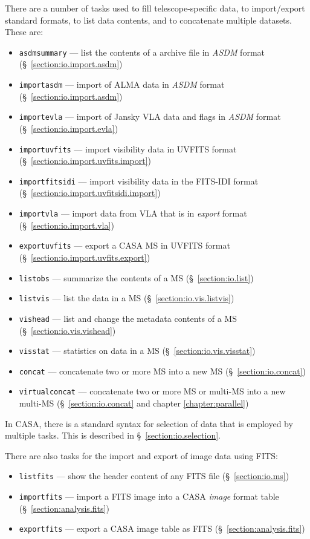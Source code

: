 There are a number of tasks used to fill telescope-specific data,
to import/export standard formats, to list data contents, and
to concatenate multiple datasets.  These are:
\begin{itemize}
   \item {\tt asdmsummary} --- list the contents of a archive file in
     {\it ASDM} format (\S~\ref{section:io.import.asdm})
   \item {\tt importasdm} --- import of ALMA data in 
         {\it ASDM} format (\S~\ref{section:io.import.asdm})
   \item {\tt importevla} --- import of Jansky VLA data and flags in 
         {\it ASDM} format (\S~\ref{section:io.import.evla})
   \item {\tt importuvfits} --- import visibility data in UVFITS
         format (\S~\ref{section:io.import.uvfits.import})
   \item {\tt importfitsidi} --- import visibility data in the
     FITS-IDI format (\S~\ref{section:io.import.uvfitsidi.import})
   \item {\tt importvla} --- import data from VLA that is in 
         {\it export} format (\S~\ref{section:io.import.vla})
   \item {\tt exportuvfits} --- export a CASA MS in UVFITS format 
         (\S~\ref{section:io.import.uvfits.export})
   \item {\tt listobs} --- summarize the contents of a MS 
         (\S~\ref{section:io.list})
   \item {\tt listvis} --- list the data in a MS 
         (\S~\ref{section:io.vis.listvis})
   \item {\tt vishead} --- list and change the metadata contents of a MS 
         (\S~\ref{section:io.vis.vishead})
   \item {\tt visstat} --- statistics on data in a MS 
         (\S~\ref{section:io.vis.visstat})
   \item {\tt concat} --- concatenate two or more MS into a
         new MS (\S~\ref{section:io.concat})
   \item {\tt virtualconcat} --- concatenate two or more MS or multi-MS into a
         new multi-MS (\S~\ref{section:io.concat} and chapter \ref{chapter:parallel})
\end{itemize}

In CASA, there is a standard syntax for selection of data that
is employed by multiple tasks.  
This is described in \S~\ref{section:io.selection}.

There are also tasks for the import and export of image data using
FITS:
\begin{itemize}
   \item {\tt listfits} --- show the header content of any FITS file
         (\S~\ref{section:io.ms})
   \item {\tt importfits} --- import a FITS image into a CASA  
         {\it image} format table 
         (\S~\ref{section:analysis.fits})
   \item {\tt exportfits} --- export a CASA image table as FITS 
         (\S~\ref{section:analysis.fits})
\end{itemize}

